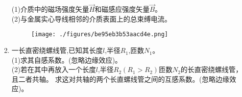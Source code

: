 \begin{enumerate}
(1)介质中的磁场强度矢量$\vec H$和磁感应强度矢量$\vec B$。\\
(2)与金属实心导线相邻的介质表面上的总束缚电流。
\begin{figure}[ht]
\centering
\texttt{[image: ./figures/be95eb3b53aacd4e.png]}
\caption{} \label{fig_SSD11_3}
\end{figure}
\item 一长直密绕螺线管,已知其长度$l$,半径$R_1$,匝数$N_1$。\\
(1)求其自感系数。(忽略边缘效应)。\\
(2)若在其中再放入一个长度$l$,半径$R_2(R_1>R_2)$匝数$N_2$的长直密绕螺线管，且二者共轴。
求这对共轴的两个长直螺线管之间的互感系数。(忽略边缘效应)。
\end{enumerate}
